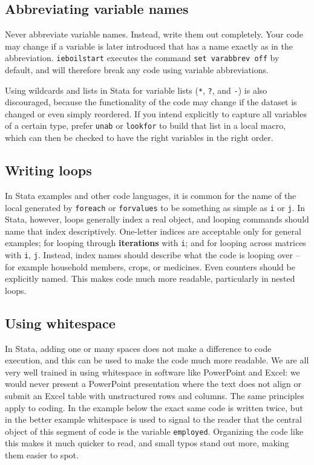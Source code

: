 \subsection*{Abbreviating variable names}

Never abbreviate variable names. Instead, write them out completely.
Your code may change if a variable is later introduced
that has a name exactly as in the abbreviation.
\texttt{ieboilstart} executes the command \texttt{set varabbrev off} by default,
and will therefore break any code using variable abbreviations.

Using wildcards and lists in Stata for variable lists
(\texttt{*}, \texttt{?}, and \texttt{-}) is also discouraged,
because the functionality of the code may change
if the dataset is changed or even simply reordered.
If you intend explicitly to capture all variables of a certain type,
prefer \texttt{unab} or \texttt{lookfor} to build that list in a local macro,
which can then be checked to have the right variables in the right order.

\subsection*{Writing loops}

In Stata examples and other code languages, it is common for the name of the local generated by \texttt{foreach} or \texttt{forvalues}
to be something as simple as \texttt{i} or \texttt{j}. In Stata, however,
loops generally index a real object, and looping commands should name that index descriptively.
One-letter indices are acceptable only for general examples;
for looping through \textbf{iterations} with \texttt{i};
and for looping across matrices with \texttt{i}, \texttt{j}.
Instead, index names should describe what the code is looping over --
for example household members, crops, or medicines.
Even counters should be explicitly named.
This makes code much more readable, particularly in nested loops.


\subsection*{Using whitespace}

In Stata, adding one or many spaces does not make a difference to code execution,
and this can be used to make the code much more readable.
We are all very well trained in using whitespace in software like PowerPoint and Excel:
we would never present a PowerPoint presentation where the text does not align
or submit an Excel table with unstructured rows and columns.
The same principles apply to coding.
In the example below the exact same code is written twice,
but in the better example whitespace is used to signal to the reader
that the central object of this segment of code is the variable \texttt{employed}.
Organizing the code like this makes it much quicker to read,
and small typos stand out more, making them easier to spot.


